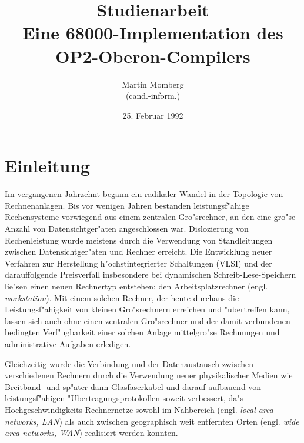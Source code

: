 
\long\def\throwaway#1\thrend{}
\def\lra{\rightarrow}
\def\LRA{\Rightarrow}
\def\caret{\hbox{\tt\char94}}
\def\refname{}
\def\to{\mathrel{.\,.}}
\def\becomes{\mathrel{:=}}

\newcommand{\oberon}{\hbox{\sc Oberon}}
\newcommand{\pascal}{\hbox{\rm PASCAL}}
\newcommand{\modula}{\hbox{\rm MODULA-2}}
\newcommand{\ceres}{\hbox{CERES-II}}
\newcommand{\OP}{\hbox{\sc OP2}}

\title{Studienarbeit\\
       Eine 68000-Implementation des OP2-Oberon-Compilers}
\author{Martin Momberg\\(cand.-inform.)}
\date{25. Februar 1992}

\maketitle

\section{Einleitung}

\throwaway
Im vergangenen Jahrzehnt begann ein radikaler Wandel in der Topologie
von Rechnenanlagen.
Bis vor wenigen Jahren bestanden leistungsf"ahige Rechensysteme
vorwiegend aus einem zentralen Gro"srechner, an den eine gro"se Anzahl
von Datensichtger"aten angeschlossen war.
Dislozierung von Rechenleistung wurde meistens durch die Verwendung von
Standleitungen zwischen Datensichtger"aten und Rechner erreicht.
Die Entwicklung neuer Verfahren zur Herstellung h"ochstintegrierter
Schaltungen (VLSI) und der darauffolgende Preisverfall insbesondere bei dynamischen
Schreib-Lese-Speichern lie"sen einen neuen Rechnertyp entstehen:
den Arbeitsplatzrechner (engl. {\it workstation}).
Mit einem solchen Rechner, der heute durchaus die Leistungsf"ahigkeit von kleinen
Gro"srechnern erreichen und "ubertreffen kann, lassen sich auch ohne einen
zentralen Gro"srechner und der damit verbundenen bedingten Verf"ugbarkeit
einer solchen Anlage mittelgro"se Rechnungen und administrative Aufgaben
erledigen.

Gleichzeitig wurde die Verbindung und der Datenaustausch zwischen verschiedenen
Rechnern durch die Verwendung neuer physikalischer Medien wie Breitband-
und sp"ater dann Glasfaserkabel und darauf aufbauend von leistungsf"ahigen
"Ubertragungsprotokollen soweit verbessert, da"s Hochgeschwindigkeits-Rechnernetze
sowohl im Nahbereich (engl. {\it local area networks, LAN}) als auch
zwischen geographisch weit entfernten Orten (engl. {\it wide area networks, WAN})
realisiert werden konnten.

